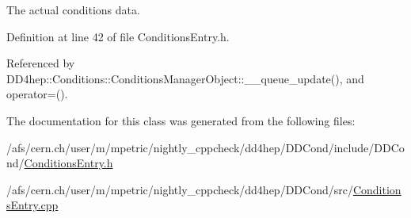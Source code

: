 The actual conditions data. 

Definition at line 42 of file ConditionsEntry.h.

Referenced by DD4hep::Conditions::ConditionsManagerObject::\_\-\_\-queue\_\-update(), and operator=().

The documentation for this class was generated from the following files:\begin{DoxyCompactItemize}
\item 
/afs/cern.ch/user/m/mpetric/nightly\_\-cppcheck/dd4hep/DDCond/include/DDCond/\hyperlink{_conditions_entry_8h}{ConditionsEntry.h}\item 
/afs/cern.ch/user/m/mpetric/nightly\_\-cppcheck/dd4hep/DDCond/src/\hyperlink{_conditions_entry_8cpp}{ConditionsEntry.cpp}\end{DoxyCompactItemize}
